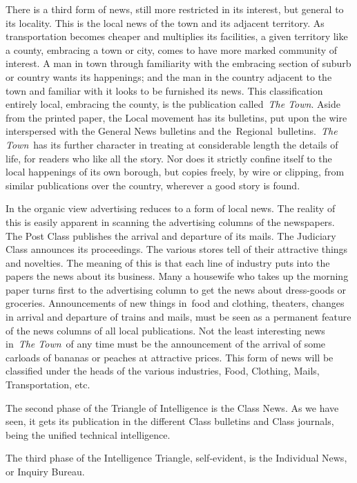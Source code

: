 \documentclass[openany,nobib]{tufte-book}
\begin{document}
There is a third form of news, still more restricted in its interest,
but general to its locality. This is the local news of the town and its
adjacent territory. As transportation becomes cheaper and multiplies its
facilities, a given territory like a county, embracing a town or city,
comes to have more marked community of interest. A man in town through
familiarity with the embracing section of suburb or country wants its
happenings; and the man in the country adjacent to the town and familiar
with it looks to be furnished its news. This classification entirely
local, embracing the county, is the publication called~\emph{The Town}.
Aside from the printed paper, the Local movement has its bulletins, put
upon the wire interspersed with the General News bulletins and
the~Regional~bulletins.~\emph{The Town}~has its further character in
treating at considerable length the details of life, for readers who
like all the story. Nor does it strictly confine itself to the local
happenings of its own borough, but copies freely, by wire or clipping,
from similar publications over the country, wherever a good story is
found.~

In the organic view advertising reduces to a form of local news. The
reality of this is easily apparent in scanning the advertising columns
of the newspapers. The Post Class publishes the arrival and departure of
its mails. The Judiciary Class announces its proceedings. The various
stores tell of their attractive things and novelties. The meaning of
this is that each line of industry puts into the papers the news about
its business. Many a housewife who takes up the morning paper turns
first to the advertising column to get the news about dress-goods or
groceries. Announcements of new things in~food and clothing, theaters,
changes in arrival and departure of trains and mails, must be seen as a
permanent feature of the news columns of all local publications. Not the
least interesting news in~\emph{The Town}~of any time must be the
announcement of the arrival of some carloads of bananas or peaches at
attractive prices. This form of news will be classified under the heads
of the various industries, Food, Clothing, Mails, Transportation, etc.~

The second phase of the Triangle of Intelligence is the Class News. As
we have seen, it gets its publication in the different Class bulletins
and Class journals, being the unified technical intelligence.~

The third phase of the Intelligence Triangle, self-evident, is the
Individual News, or Inquiry Bureau.~
\end{document}
